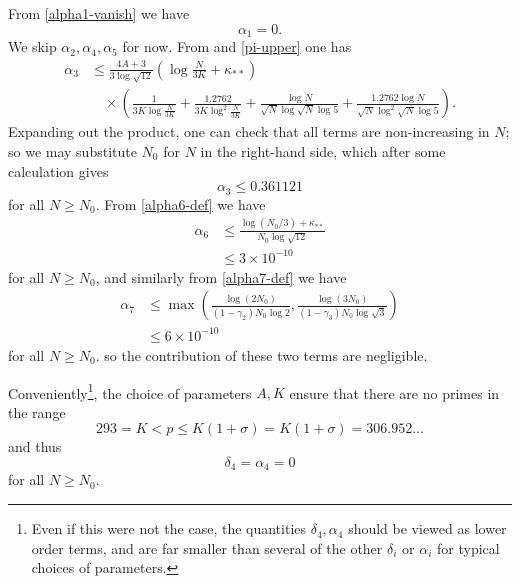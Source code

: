\documentclass[12pt,a4paper,reqno]{amsart}
\numberwithin{equation}{section}
\theoremstyle{plain}
\theoremstyle{definition}
\begin{document}
From \eqref{alpha1-vanish} we have
$$ \alpha_1 = 0.$$
We skip $\alpha_2, \alpha_4, \alpha_5$ for now.  From  and \eqref{pi-upper} one has
\begin{align*}
  \alpha_3 &\leq \frac{4A+3}{3\log \sqrt{12}} \left(\log \frac{N}{3K} + \kappa_{**}\right)  \\
&\quad \times \left(
  \frac{1}{3K \log\frac{N}{3K}} + \frac{1.2762}{3K \log^2\frac{N}{3K}}
  + \frac{\log N}{\sqrt{N} \log \sqrt{N}\log 5 } + \frac{1.2762 \log N}{\sqrt{N} \log^2 \sqrt{N}\log 5 } \right).
\end{align*}
Expanding out the product, one can check that all terms are non-increasing in $N$; so we may substitute $N_0$ for $N$ in the right-hand side, which after some calculation gives
$$ \alpha_3 \leq 0.361121$$
for all $N \geq N_0$.
From \eqref{alpha6-def} we have
\begin{align*}
   \alpha_6 &\leq \frac{\log(N_0/3) + \kappa_{**}}{N_0 \log \sqrt{12}} \\
   &\leq 3 \times 10^{-10}
\end{align*}
for all $N \geq N_0$, and similarly from \eqref{alpha7-def} we have
\begin{align*}
\alpha_7 &\leq \max\left( \frac{\log(2N_0)}{(1-\gamma_2)N_0\log 2},  \frac{\log(3N_0)}{(1-\gamma_3)N_0\log \sqrt{3}}\right) \\
&\leq 6 \times 10^{-10}
\end{align*}
for all $N \geq N_0$.
so the contribution of these two terms are negligible.

Conveniently\footnote{Even if this were not the case, the quantities $\delta_4,\alpha_4$ should be viewed as lower order terms, and are far smaller than several of the other $\delta_i$ or $\alpha_i$ for typical choices of parameters.}, the choice of parameters $A,K$ ensure that there are no primes in the range
$$ 293 = K < p \leq K(1+\sigma) = K(1+\sigma)=306.952\dots$$
and thus
$$ \delta_4=\alpha_4 = 0$$
for all $N \geq N_0$.
\end{document}
